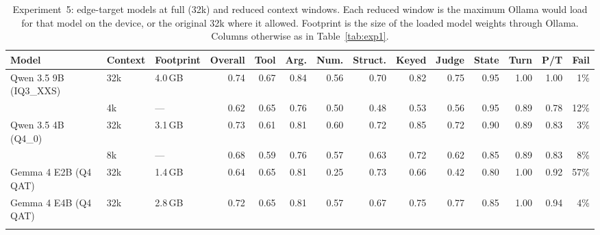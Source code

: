 \begin{table}[!t]
\centering
\caption{Experiment~5: edge-target models at full (32k) and reduced context windows. Each reduced window is the maximum Ollama would load for that model on the device, or the original 32k where it allowed. Footprint is the size of the loaded model weights through Ollama. Columns otherwise as in Table~\ref{tab:exp1}.}
\label{tab:exp4}
\small
\setlength{\tabcolsep}{4pt}
\begin{tabular}{@{}lll rrrrrrrrrrr@{}}
\toprule
Model & Context & Footprint & Overall & Tool & Arg. & Num. & Struct. & Keyed & Judge & State & Turn & P/T & Fail \\
\midrule
Qwen 3.5 9B (IQ3\_XXS) & 32k & 4.0\,GB & 0.74 & 0.67 & 0.84 & 0.56 & 0.70 & 0.82 & 0.75 & 0.95 & 1.00 & 1.00 & 1\% \\
 & 4k & --- & 0.62 & 0.65 & 0.76 & 0.50 & 0.48 & 0.53 & 0.56 & 0.95 & 0.89 & 0.78 & 12\% \\
\addlinespace
Qwen 3.5 4B (Q4\_0) & 32k & 3.1\,GB & 0.73 & 0.61 & 0.81 & 0.60 & 0.72 & 0.85 & 0.72 & 0.90 & 0.89 & 0.83 & 3\% \\
 & 8k & --- & 0.68 & 0.59 & 0.76 & 0.57 & 0.63 & 0.72 & 0.62 & 0.85 & 0.89 & 0.83 & 8\% \\
\addlinespace
Gemma 4 E2B (Q4 QAT) & 32k & 1.4\,GB & 0.64 & 0.65 & 0.81 & 0.25 & 0.73 & 0.66 & 0.42 & 0.80 & 1.00 & 0.92 & 57\% \\
\addlinespace
Gemma 4 E4B (Q4 QAT) & 32k & 2.8\,GB & 0.72 & 0.65 & 0.81 & 0.57 & 0.67 & 0.75 & 0.77 & 0.85 & 1.00 & 0.94 & 4\% \\
\addlinespace
\bottomrule
\end{tabular}
\end{table}
